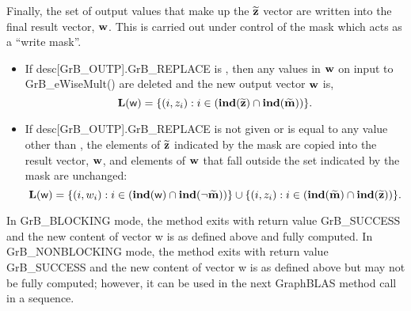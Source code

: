 Finally, the set of output values that make up the ${\bf \widetilde{z}}$ 
vector are written into the final result vector, ${\bf w}$. 
This is carried out under control of the mask which acts as a ``write mask''.
\begin{itemize}
\item If {\sf desc[GrB\_OUTP].GrB\_REPLACE} is \true, then any values in ${\bf w}$ 
on input to {\sf GrB\_eWiseMult()} are deleted and the new output vector ${\bf w}$ is,
\[ \bold{L}({\sf w}) = \{(i,z_{i}) : i \in (\bold{ind}({\bf \widetilde{z}}) 
\cap \bold{ind}({\bf \widetilde{m}})) \}. \]

\item If {\sf desc[GrB\_OUTP].GrB\_REPLACE} is not given or is equal to any 
value other than \true, the elements of ${\bf \widetilde{z}}$ indicated by 
the mask are copied into the result vector, ${\bf w}$, and elements of 
${\bf w}$ that fall outside the set indicated by the mask are unchanged:
\[ \bold{L}({\sf w}) = \{(i,w_{i}) : i \in (\bold{ind}({\bf \sf w}) 
\cap \bold{ind}(\neg {\bf \widetilde{m}})) \} \cup \{(i,z_{i}) : i \in 
(\bold{ind}({\bf \widetilde{m}}) \cap \bold{ind}({\bf \widetilde{z}})) \}. \]
\end{itemize}

In {\sf GrB\_BLOCKING} mode, the method exits with return value 
{\sf GrB\_SUCCESS} and the new content of vector {\sf w} is as defined above
and fully computed.  
In {\sf GrB\_NONBLOCKING} mode, the method exits with return value 
{\sf GrB\_SUCCESS} and the new content of vector {\sf w} is as defined above 
but may not be fully computed; however, it can be used in the next GraphBLAS 
method call in a sequence.


